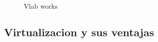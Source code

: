 
\begin{figure}[!htb]
    \centering
    \caption{Vlab works}
    \label{fig:vlab-presentation}
\end{figure}

\subsection{Virtualizacion y sus ventajas}
